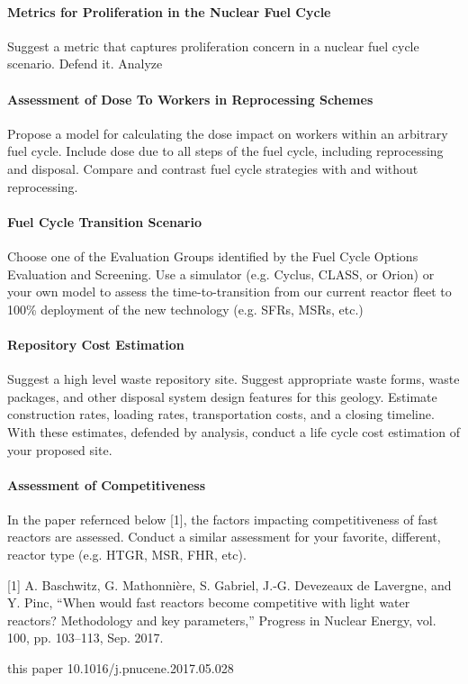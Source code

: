 \documentclass[12pts, answers]{exam}
\begin{document}
\paragraph{Metrics for Proliferation in the Nuclear Fuel Cycle} Suggest a
metric that captures proliferation concern in a nuclear fuel cycle scenario.
Defend it. Analyze 

\paragraph{Assessment of Dose To Workers in Reprocessing Schemes} Propose a model for
calculating the dose impact on workers within an arbitrary fuel cycle. Include
dose due to all steps of the fuel cycle, including reprocessing and disposal.
Compare and contrast fuel cycle strategies with and without reprocessing. 

\paragraph{Fuel Cycle Transition Scenario} Choose one of the Evaluation Groups
identified by the Fuel Cycle Options Evaluation and Screening. Use a simulator
(e.g. Cyclus, CLASS, or Orion) or your own model to assess the
time-to-transition from our current reactor fleet to 100\% deployment of the
new technology (e.g. SFRs, MSRs, etc.)

\paragraph{Repository Cost Estimation} Suggest a high level waste repository
site. Suggest appropriate waste forms, waste packages, and other disposal
system design features for this geology. Estimate construction rates, loading
rates, transportation costs, and a closing timeline. With these estimates,
defended by analysis, conduct a life cycle cost estimation of your proposed
site.

\paragraph{Assessment of Competitiveness}
In the paper refernced below [1], the factors impacting competitiveness of fast 
reactors are assessed. Conduct a similar assessment for your favorite, 
different, reactor type (e.g. HTGR, MSR, FHR, etc).

[1] A. Baschwitz, G. Mathonnière, S. Gabriel, J.-G. Devezeaux de Lavergne, and 
Y. Pinc, “When would fast reactors become competitive with light water 
reactors? Methodology and key parameters,” Progress in Nuclear Energy, vol. 
100, pp. 103–113, Sep. 2017.


this paper 10.1016/j.pnucene.2017.05.028

%
%
\end{document}
